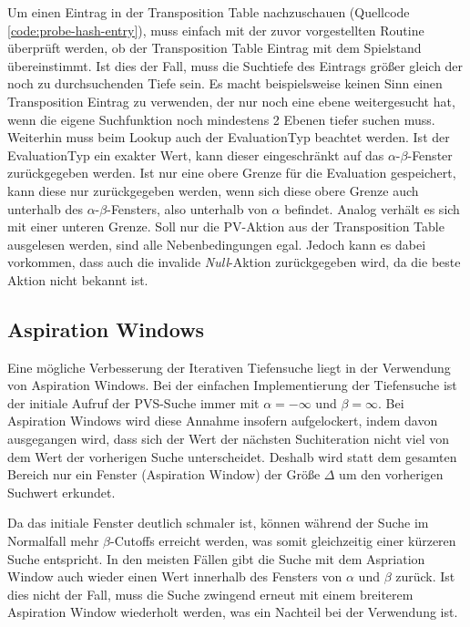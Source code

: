 Um einen Eintrag in der Transposition Table nachzuschauen (Quellcode \ref{code:probe-hash-entry}), muss einfach mit der zuvor vorgestellten Routine überprüft werden, ob der Transposition Table Eintrag mit dem Spielstand übereinstimmt. Ist dies der Fall, muss die Suchtiefe des Eintrags größer gleich der noch zu durchsuchenden Tiefe sein. Es macht beispielsweise keinen Sinn einen Transposition Eintrag zu verwenden, der nur noch eine ebene weitergesucht hat, wenn die eigene Suchfunktion noch mindestens 2 Ebenen tiefer suchen muss. Weiterhin muss beim Lookup auch der EvaluationTyp beachtet werden. Ist der EvaluationTyp ein exakter Wert, kann dieser eingeschränkt auf das $\alpha$-$\beta$-Fenster zurückgegeben werden. Ist nur eine obere Grenze für die Evaluation gespeichert, kann diese nur zurückgegeben werden, wenn sich diese obere Grenze auch unterhalb des $\alpha$-$\beta$-Fensters, also unterhalb von $\alpha$ befindet. Analog verhält es sich mit einer unteren Grenze. Soll nur die \ac{PV}-Aktion aus der Transposition Table ausgelesen werden, sind alle Nebenbedingungen egal. Jedoch kann es dabei vorkommen, dass auch die invalide \emph{Null}-Aktion zurückgegeben wird, da die beste Aktion nicht bekannt ist.

\pagebreak



\pagebreak

\subsection{Aspiration Windows}

Eine mögliche Verbesserung der Iterativen Tiefensuche liegt in der Verwendung von Aspiration Windows. Bei der einfachen Implementierung der Tiefensuche ist der initiale Aufruf der \ac{PVS}-Suche immer mit $\alpha = -\infty$ und $\beta = \infty$. Bei Aspiration Windows wird diese Annahme insofern aufgelockert, indem davon ausgegangen wird, dass sich der Wert der nächsten Suchiteration nicht viel von dem Wert der vorherigen Suche unterscheidet. Deshalb wird statt dem gesamten Bereich nur ein Fenster (Aspiration Window) der Größe $\Delta$ um den vorherigen Suchwert erkundet. \cite{2003.AspirationWindows}

Da das initiale Fenster deutlich schmaler ist, können während der Suche im Normalfall mehr $\beta$-Cutoffs erreicht werden, was somit gleichzeitig einer kürzeren Suche entspricht. In den meisten Fällen gibt die Suche mit dem Aspriation Window auch wieder einen Wert innerhalb des Fensters von $\alpha$ und $\beta$ zurück. Ist dies nicht der Fall, muss die Suche zwingend erneut mit einem breiterem Aspiration Window wiederholt werden, was ein Nachteil bei der Verwendung ist.

